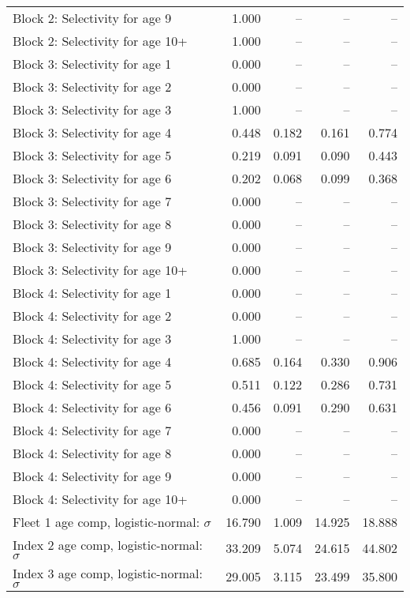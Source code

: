 \documentclass[
]{article}
\begin{document}
\begin{landscape}
\begin{longtable}[t]{lrrrr}
Block 2: Selectivity for age 9 & 1.000 & -- & -- & --\\
Block 2: Selectivity for age 10+ & 1.000 & -- & -- & --\\
Block 3: Selectivity for age 1 & 0.000 & -- & -- & --\\
Block 3: Selectivity for age 2 & 0.000 & -- & -- & --\\
\addlinespace
Block 3: Selectivity for age 3 & 1.000 & -- & -- & --\\
Block 3: Selectivity for age 4 & 0.448 & 0.182 & 0.161 & 0.774\\
Block 3: Selectivity for age 5 & 0.219 & 0.091 & 0.090 & 0.443\\
Block 3: Selectivity for age 6 & 0.202 & 0.068 & 0.099 & 0.368\\
Block 3: Selectivity for age 7 & 0.000 & -- & -- & --\\
\addlinespace
Block 3: Selectivity for age 8 & 0.000 & -- & -- & --\\
Block 3: Selectivity for age 9 & 0.000 & -- & -- & --\\
Block 3: Selectivity for age 10+ & 0.000 & -- & -- & --\\
Block 4: Selectivity for age 1 & 0.000 & -- & -- & --\\
Block 4: Selectivity for age 2 & 0.000 & -- & -- & --\\
\addlinespace
Block 4: Selectivity for age 3 & 1.000 & -- & -- & --\\
Block 4: Selectivity for age 4 & 0.685 & 0.164 & 0.330 & 0.906\\
Block 4: Selectivity for age 5 & 0.511 & 0.122 & 0.286 & 0.731\\
Block 4: Selectivity for age 6 & 0.456 & 0.091 & 0.290 & 0.631\\
Block 4: Selectivity for age 7 & 0.000 & -- & -- & --\\
\addlinespace
Block 4: Selectivity for age 8 & 0.000 & -- & -- & --\\
Block 4: Selectivity for age 9 & 0.000 & -- & -- & --\\
Block 4: Selectivity for age 10+ & 0.000 & -- & -- & --\\
Fleet 1 age comp, logistic-normal: $\sigma$ & 16.790 & 1.009 & 14.925 & 18.888\\
Index 2 age comp, logistic-normal: $\sigma$ & 33.209 & 5.074 & 24.615 & 44.802\\
\addlinespace
Index 3 age comp, logistic-normal: $\sigma$ & 29.005 & 3.115 & 23.499 & 35.800\\*
\end{longtable}
\end{landscape}
\end{document}
